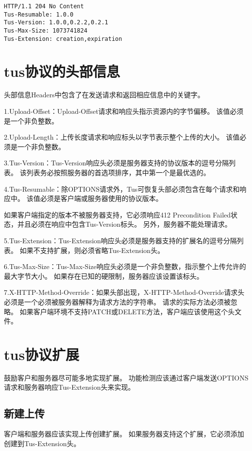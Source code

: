 \documentclass[bachelor]{thesis-uestc}
\begin{document}
\begin{lstlisting}[title=Response]
HTTP/1.1 204 No Content
Tus-Resumable: 1.0.0
Tus-Version: 1.0.0,0.2.2,0.2.1
Tus-Max-Size: 1073741824
Tus-Extension: creation,expiration
\end{lstlisting}

\section{tus协议的头部信息}
头部信息Headers中包含了在发送请求和返回相应信息中的关键字。

1.Upload-Offset：Upload-Offset请求和响应头指示资源内的字节偏移。 该值必须是一个非负整数。

2.Upload-Length：上传长度请求和响应标头以字节表示整个上传的大小。 该值必须是一个非负整数。

3.Tus-Version：Tus-Version响应头必须是服务器支持的协议版本的逗号分隔列表。 该列表务必按照服务器的首选项排序，其中第一个是最优选的。

4.Tus-Resumable：除OPTIONS请求外，Tus可恢复头部必须包含在每个请求和响应中。 该值必须是客户端或服务器使用的协议版本。
\par 如果客户端指定的版本不被服务器支持，它必须响应412 Precondition Failed状态，并且必须在响应中包含Tus-Version标头。 另外，服务器不能处理请求。

5.Tus-Extension：Tus-Extension响应头必须是服务器支持的扩展名的逗号分隔列表。 如果不支持扩展，则必须省略Tus-Extension头。

6.Tus-Max-Size：Tus-Max-Size响应头必须是一个非负整数，指示整个上传允许的最大字节大小。 如果存在已知的硬限制，服务器应该设置该标头。

7.X-HTTP-Method-Override：如果头部出现，X-HTTP-Method-Override请求头必须是一个必须被服务器解释为请求方法的字符串。 请求的实际方法必须被忽略。 如果客户端环境不支持PATCH或DELETE方法，客户端应该使用这个头文件。

\section{tus协议扩展}
鼓励客户和服务器尽可能多地实现扩展。 功能检测应该通过客户端发送OPTIONS请求和服务器响应Tus-Extension头来实现。

\subsection{新建上传}
客户端和服务器应该实现上传创建扩展。 如果服务器支持这个扩展，它必须添加创建到Tus-Extension头。
\end{document}
